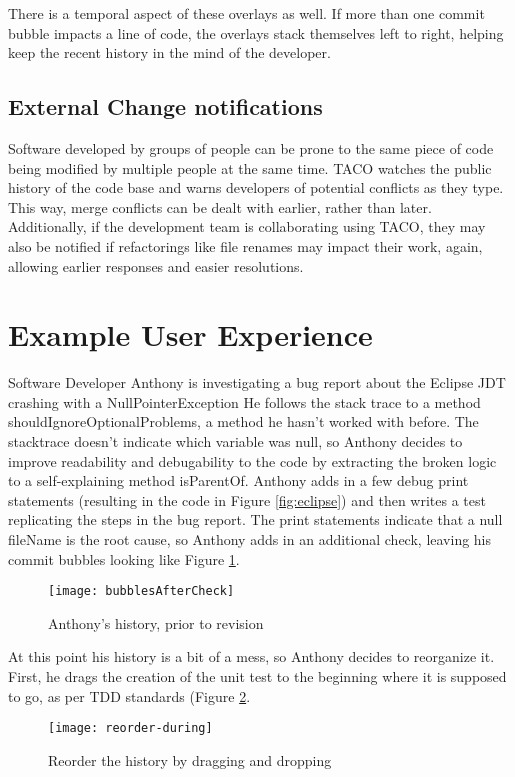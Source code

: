 \documentclass[conference]{IEEEtran}
\begin{document}
There is a temporal aspect of these overlays as well.
If more than one commit bubble impacts a line of code, the overlays stack
themselves left to right, helping keep the recent history in the mind of 
the developer.

\subsection{External Change notifications}
Software developed by groups of people can be prone to the same piece of code
being modified by multiple people at the same time.
TACO watches the public history of the code base and warns developers
of potential conflicts as they type.  
This way, merge conflicts can be dealt with earlier, rather than later.
Additionally, if the development team is collaborating using TACO, they
may also be notified if refactorings like file renames may impact their work, again, allowing earlier responses and easier resolutions.

\section{Example User Experience}
Software Developer Anthony is investigating a bug report about the Eclipse JDT crashing with a NullPointerException
He follows the stack trace to a method shouldIgnoreOptionalProblems, a method he hasn't worked with before.
The stacktrace doesn't indicate which variable was null, so Anthony decides to improve readability and debugability 
to the code by extracting the broken logic to a self-explaining method isParentOf.
Anthony adds in a few debug print statements (resulting in the code in Figure \ref{fig:eclipse}) and then writes a test replicating 
the steps in the bug report.
The print statements indicate that a null fileName is the root cause, so Anthony adds in an additional check,
leaving his commit bubbles looking like Figure \ref{fig:unfixed-history}.
\begin{figure}[h]
\centering
\texttt{[image: bubblesAfterCheck]}
\caption{Anthony's history, prior to revision}
\label{fig:unfixed-history}
\end{figure}

At this point his history is a bit of a mess, so Anthony decides to reorganize it.
First, he drags the creation of the unit test to the beginning where it is supposed to go, as per TDD standards (Figure \ref{fig:reordering}.
\begin{figure}[h]
\centering
\texttt{[image: reorder-during]}
\caption{Reorder the history by dragging and dropping}
\label{fig:reordering}
\end{figure}
\end{document}
